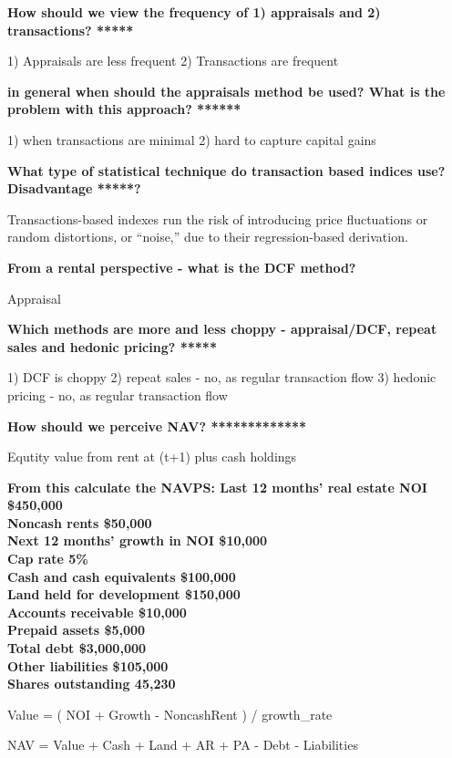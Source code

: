 \documentclass[12pt]{article}
\begin{document}
\begin{framed}
\textbf{How should we view the frequency of 1) appraisals and 2) transactions? *****}

1) Appraisals are less frequent 
2) Transactions are frequent

\textbf{in general when should the appraisals method be used? What is the problem with this approach? ******}

1) when transactions are minimal
2) hard to capture capital gains 

\textbf{What type of statistical technique do transaction based indices use? Disadvantage *****?}

Transactions-based indexes run the risk of introducing price fluctuations or random distortions, or “noise,” due to their regression-based derivation.

\textbf{From a rental perspective - what is the DCF method?}

Appraisal

\textbf{Which methods are more and less choppy - appraisal/DCF, repeat sales and hedonic pricing? *****}

1) DCF is choppy 
2) repeat sales - no, as regular transaction flow
3) hedonic pricing - no, as regular transaction flow

\textbf{How should we perceive NAV? *************}

Equtity value from rent at (t+1) plus cash holdings

\textbf{From this calculate the NAVPS: 
	\newline
	Last 12 months' real estate NOI	\$450,000 \\
	Noncash rents	\$50,000  \\
	Next 12 months' growth in NOI	\$10,000  \\
	Cap rate	5\%  \\
	Cash and cash equivalents	\$100,000  \\
	Land held for development	\$150,000  \\
	Accounts receivable	\$10,000  \\
	Prepaid assets	\$5,000  \\
	Total debt	\$3,000,000  \\
	Other liabilities	\$105,000  \\
	Shares outstanding	45,230  \\
}


Value = ( NOI + Growth - NoncashRent ) / growth_rate

NAV = Value + Cash + Land + AR + PA - Debt - Liabilities


\end{framed}
\end{document}
